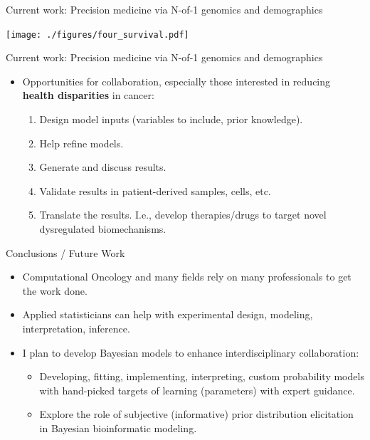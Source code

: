 \documentclass[ignorenonframetext,aspectratio=169,]{beamer}
\begin{document}
\begin{frame}{%
\protect\hypertarget{current-work-precision-medicine-via-n-of-1-genomics-and-demographics-1}{%
Current work: Precision medicine via N-of-1 genomics and demographics}}

\centering

\texttt{[image: ./figures/four\_survival.pdf]}

\end{frame}

\begin{frame}{%
\protect\hypertarget{current-work-precision-medicine-via-n-of-1-genomics-and-demographics-2}{%
Current work: Precision medicine via N-of-1 genomics and demographics}}

\begin{itemize}
\item
  Opportunities for collaboration, especially those interested in
  reducing \textbf{health disparities} in cancer:

  \begin{enumerate}
  [1)]
  \item
    Design model inputs (variables to include, prior knowledge).
  \item
    Help refine models.
  \item
    Generate and discuss results.
  \item
    Validate results in patient-derived samples, cells, etc.
  \item
    Translate the results. I.e., develop therapies/drugs to target novel
    dysregulated biomechanisms.
  \end{enumerate}
\end{itemize}

\end{frame}

\begin{frame}{%
\protect\hypertarget{conclusions-future-work}{%
Conclusions / Future Work}}

\begin{itemize}
\item
  Computational Oncology and many fields rely on many professionals to
  get the work done.
\item
  Applied statisticians can help with experimental design, modeling,
  interpretation, inference.
\item
  I plan to develop Bayesian models to enhance interdisciplinary
  collaboration:

  \begin{itemize}
  \item
    Developing, fitting, implementing, interpreting, custom probability
    models with hand-picked targets of learning (parameters) with expert
    guidance.
  \item
    Explore the role of subjective (informative) prior distribution
    elicitation in Bayesian bioinformatic modeling.
  \end{itemize}
\end{itemize}

\end{frame}
\end{document}
